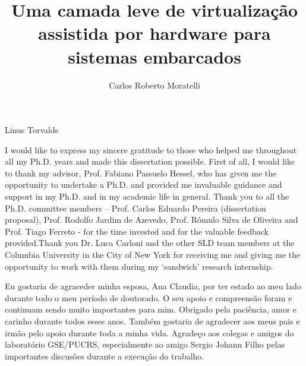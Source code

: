 \documentclass[english,twoside]{pucrs-ppgcc}
\author{Carlos Roberto Moratelli}
\title{Uma camada leve de virtualização assistida por hardware para sistemas embarcados}
      {A lightweight virtualization layer with hardware-assistance for embedded systems}
\begin{document}

         {Linus Torvalds}


\begin{agradecimentos}

I would like to express my sincere gratitude to those who helped me throughout all my Ph.D. years and made this dissertation possible. First of all, I would like to thank my advisor, Prof. Fabiano Passuelo Hessel, who has given me the opportunity to undertake a Ph.D. and provided me invaluable guidance and support in my Ph.D. and in my academic life in general. Thank you to all the Ph.D. committee members – Prof. Carlos Eduardo Pereira (dissertation proposal), Prof. Rodolfo Jardim de Azevedo, Prof. Rômulo Silva de Oliveira and Prof. Tiago Ferreto - for the time invested and for the valuable feedback provided.Thank you Dr. Luca Carloni and the other SLD team members at the Columbia University in the City of New York for receiving me and giving me the opportunity to work with them during my ‘sandwich’ research internship. 

Eu gostaria de agraceder minha esposa, Ana Claudia, por ter estado ao meu lado durante todo o meu período de doutorado. O seu apoio e compreensão foram e continuam sendo muito importantes para mim. Obrigado pela paciência, amor e carinho durante todos esses anos. Também gostaria de agradecer aos meus pais e irmão pelo apoio durante toda a minha vida. Agradeço aos colegas e amigos do laboratório GSE/PUCRS, especialmente ao amigo Sergio Johann Filho pelas importantes discusões durante a execução do trabalho. 



\end{agradecimentos}
\end{document}
